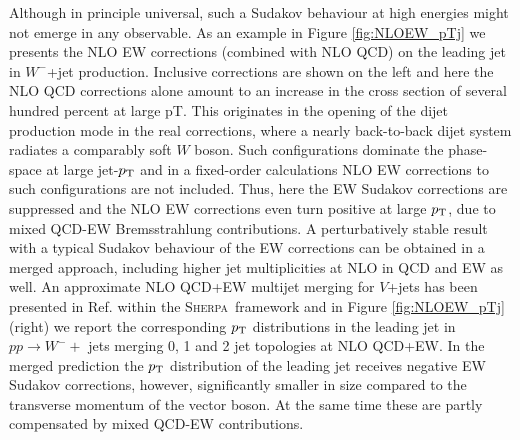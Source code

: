 \documentclass[a4paper,11pt,notoc]{article}
\newcommand{\SHERPA}{\textsc{Sherpa}}
\begin{document}
Although in principle universal, such a Sudakov behaviour at high energies might
not emerge in any observable. As an example in Figure \ref{fig:NLOEW_pTj} we
presents the NLO EW corrections (combined with NLO QCD) on the leading jet in
$W^-$+jet production. Inclusive corrections are shown on the left and here the NLO
QCD corrections alone amount to an increase in the cross section of several
hundred percent at large pT. This originates in the opening of the dijet
production mode in the real corrections, where a nearly back-to-back dijet
system radiates a comparably soft $W$ boson. Such configurations dominate the
phase-space at large jet-$p_{\rm T}$ and in a fixed-order calculations NLO EW
corrections to such configurations are not included. Thus, here the EW Sudakov
corrections are suppressed and the NLO EW corrections even turn positive at
large $p_{\rm T}$, due to mixed QCD-EW Bremsstrahlung contributions. A perturbatively stable result with
a typical Sudakov behaviour of the EW corrections can be obtained
in a merged approach, including higher jet multiplicities at NLO in QCD and EW as
well. An approximate NLO QCD+EW multijet merging for $V$+jets has been presented
in Ref. \cite{Kallweit:2015dum} within the \SHERPA\, framework and in Figure \ref{fig:NLOEW_pTj} (right) 
we report the corresponding $p_{\rm T}$ distributions in the leading jet in $p p \to W^- +$ jets
merging 0, 1 and 2 jet topologies at NLO QCD+EW.
In the merged prediction the $p_{\rm T}$ distribution of the leading jet receives negative EW Sudakov 
corrections, however, significantly smaller  in size compared to the transverse 
momentum of the vector boson. At the same time these
are partly compensated by mixed QCD-EW contributions.
\end{document}
